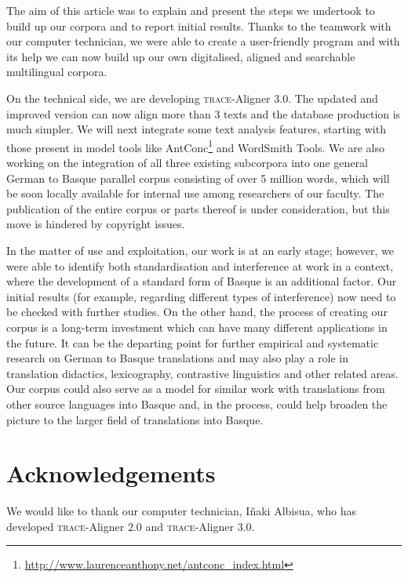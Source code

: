 \documentclass[output=paper]{LSP/langsci}
\begin{document}
The aim of this article was to explain and present the steps we undertook to build up our corpora and to report initial results. Thanks to the teamwork with our computer technician, we were able to create a user-friendly program and with its help we can now build up our own digitalised, aligned and searchable multilingual corpora.

On the technical side, we are developing \textsc{trace}-Aligner 3.0. The updated and improved version can now align more than 3 texts and the database production is much simpler. We will next integrate some text analysis features, starting with those present in model tools like AntConc\footnote{\url{http://www.laurenceanthony.net/antconc_index.html}} and WordSmith Tools. We are also working on the integration of all three existing subcorpora into one general German to Basque parallel corpus consisting of over 5 million words, which will be soon locally available for internal use among researchers of our faculty. The publication of the entire corpus or parts thereof is under consideration, but this move is hindered by copyright issues.

In the matter of use and exploitation, our work is at an early stage; however, we were able to identify both standardisation and interference at work in a context, where the development of a standard form of Basque is an additional factor. Our initial results (for example, regarding different types of interference) now need to be checked with further studies. On the other hand, the process of creating our corpus is a long-term investment which can have many different applications in the future. It can be the departing point for further empirical and systematic research on German to Basque translations and may also play a role in translation didactics, lexicography, contrastive linguistics and other related areas. Our corpus could also serve as a model for similar work with translations from other source languages into Basque and, in the process, could help broaden the picture to the larger field of translations into Basque.


\section*{Acknowledgements}

We would like to thank our computer technician, Iñaki Albisua, who has developed \textsc{trace}-Aligner 2.0 and \textsc{trace}-Aligner 3.0.

\printbibliography[heading=subbibliography,notkeyword=this]
\end{document}
